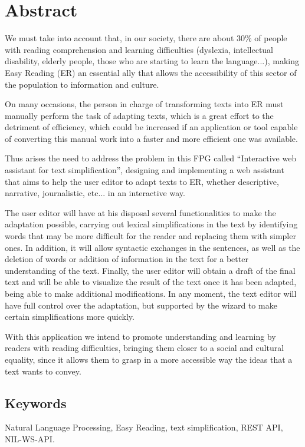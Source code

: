 \chapter*{Abstract}

We must take into account that, in our society, there are about 30\% of people with reading comprehension and learning difficulties (dyslexia, intellectual disability, elderly people, those who are starting to learn the language...), making Easy Reading (ER) an essential ally that allows the accessibility of this sector of the population to information and culture. 


On many occasions, the person in charge of transforming texts into ER must manually perform the task of adapting texts, which is a great effort to the detriment of efficiency, which could be increased if an application or tool capable of converting this manual work into a faster and more efficient one was available.


Thus arises the need to address the problem in this FPG called ``Interactive web assistant for text simplification'', designing and implementing a web assistant that aims to help the user editor to adapt texts to ER, whether descriptive, narrative, journalistic, etc... in an interactive way. 


The user editor will have at his disposal several functionalities to make the adaptation possible, carrying out lexical simplifications in the text by identifying words that may be more difficult for the reader and replacing them with simpler ones. In addition, it will allow syntactic exchanges in the sentences, as well as the deletion of words or addition of information in the text for a better understanding of the text. Finally, the user editor will obtain a draft of the final text and will be able to visualize the result of the text once it has been adapted, being able to make additional modifications. In any moment, the text editor will have full control over the adaptation, but supported by the wizard to make certain simplifications more quickly.


With this application we intend to promote understanding and learning by readers with reading difficulties, bringing them closer to a social and cultural equality, since it allows them to grasp in a more accessible way the ideas that a text wants to convey.


\section*{Keywords}

\noindent Natural Language Processing, Easy Reading, text simplification, REST API, NIL-WS-API.

